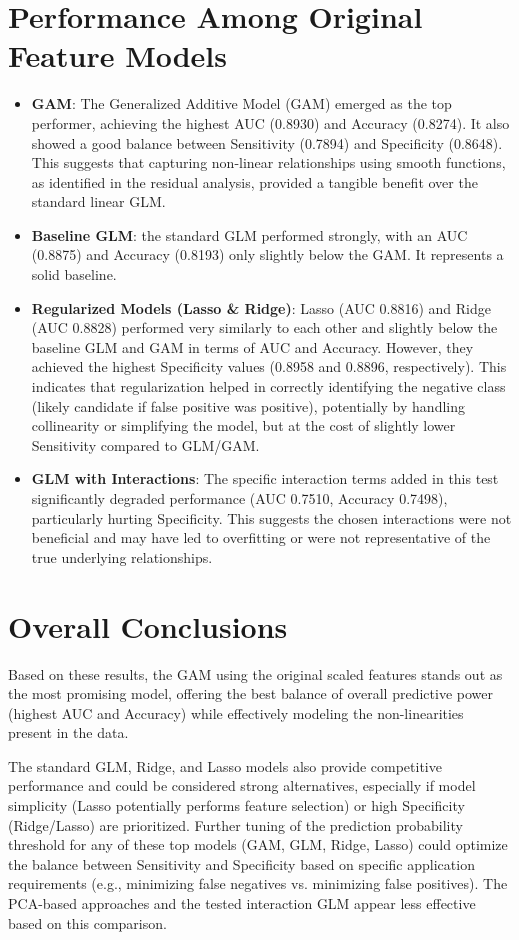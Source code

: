 \section{Performance Among Original Feature Models}
\begin{itemize}
    \item \textbf{GAM}: The Generalized Additive Model (GAM) emerged as the top performer, achieving the highest AUC (0.8930) and Accuracy (0.8274). It also showed a good balance between Sensitivity (0.7894) and Specificity (0.8648). This suggests that capturing non-linear relationships using smooth functions, as identified in the residual analysis, provided a tangible benefit over the standard linear GLM.
    \item \textbf{Baseline GLM}: the standard GLM performed strongly, with an AUC (0.8875) and Accuracy (0.8193) only slightly below the GAM. It represents a solid baseline.
    \item \textbf{Regularized Models (Lasso \& Ridge)}: Lasso (AUC 0.8816) and Ridge (AUC 0.8828) performed very similarly to each other and slightly below the baseline GLM and GAM in terms of AUC and Accuracy. However, they achieved the highest Specificity values (0.8958 and 0.8896, respectively). This indicates that regularization helped in correctly identifying the negative class (likely candidate if false positive was positive), potentially by handling collinearity or simplifying the model, but at the cost of slightly lower Sensitivity compared to GLM/GAM.
    \item \textbf{GLM with Interactions}: The specific interaction terms added in this test significantly degraded performance (AUC 0.7510, Accuracy 0.7498), particularly hurting Specificity. This suggests the chosen interactions were not beneficial and may have led to overfitting or were not representative of the true underlying relationships.
\end{itemize}

\section{Overall Conclusions}
Based on these results, the GAM using the original scaled features stands out as the most promising model, offering the best balance of overall predictive power (highest AUC and Accuracy) while effectively modeling the non-linearities present in the data.

The standard GLM, Ridge, and Lasso models also provide competitive performance and could be considered strong alternatives, especially if model simplicity (Lasso potentially performs feature selection) or high Specificity (Ridge/Lasso) are prioritized. Further tuning of the prediction probability threshold for any of these top models (GAM, GLM, Ridge, Lasso) could optimize the balance between Sensitivity and Specificity based on specific application requirements (e.g., minimizing false negatives vs. minimizing false positives). The PCA-based approaches and the tested interaction GLM appear less effective based on this comparison.

